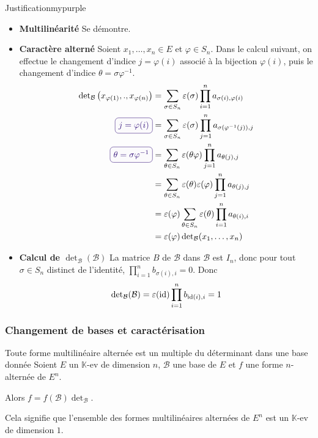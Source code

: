     \begin{demo}{Justification}{mypurple}
        \begin{itemize}
            \item \textbf{Multilinéarité} \quad Se démontre.
            \item \textbf{Caractère alterné} \quad Soient $x_1,\ldots,x_n \in E$ et $\varphi \in S_n$. Dans le calcul suivant, on effectue le changement d’indice $j = \varphi(i)$ associé à la bijection $\varphi(i)$, puis le changement d’indice $\theta = \sigma \varphi^{-1}$.
            \begin{align*}
                \det_{\mathcal{B}}\left(x_{\varphi(1)},.,x_{\varphi(n)}\right) 
                &= \sum_{\sigma \in S_n} \varepsilon(\sigma) \prod_{i = 1}^n a_{\sigma(i), \varphi(i)} \\
                \lilbox{mypurple}{$j = \varphi(i)$} 
                &= \sum_{\sigma \in S_n} \varepsilon(\sigma) \prod_{j = 1}^n a_{\sigma(\varphi^{-1}(j)), j} \\
                \lilbox{mypurple}{$\theta = \sigma \varphi^{-1}$} 
                &= \sum_{\theta \in S_n} \varepsilon(\theta \varphi) \prod_{j = 1}^n a_{\theta(j), j} \\
                &= \sum_{\theta \in S_n} \varepsilon(\theta)\varepsilon(\varphi) \prod_{j = 1}^n a_{\theta(j), j} \\
                &= \varepsilon(\varphi) \sum_{\theta \in S_n} \varepsilon(\theta) \prod_{i = 1}^n a_{\theta(i), i} \\
                &= \varepsilon(\varphi) \det_{\mathcal{B}}(x_1,\ldots,x_n)
            \end{align*}
            \item \textbf{Calcul de $\det_{\mathcal{B}}(\mathcal{B})$} \quad La matrice $B$ de $\mathcal{B}$ dans $\mathcal{B}$ est $I_n$, donc pour tout $\sigma \in S_n$ distinct de l’identité, $\prod_{i=1}^n b_{\sigma(i),i} = 0$. Donc 
            \[ \operatorname{det}_{\mathcal{B}}(\mathcal{B}) = \varepsilon(\operatorname{id}) \prod_{i=1}^n b_{\operatorname{id}(i), i} = 1 \]
        \end{itemize}
    \end{demo}

    \subsubsection{Changement de bases et caractérisation}

    \begin{theo}{Toute forme multilinéaire alternée est un multiple du déterminant dans une base donnée}{}
        Soient $E$ un $\mathbb{K}$-ev de dimension $n$, $\mathcal{B}$ une base de $E$ et $f$ une forme $n$-alternée de $E^n$.

        Alors $f = f(\mathcal{B}) \det_{\mathcal{B}}$.

        Cela signifie que l’ensemble des formes multilinéaires alternées de $E^n$ est un $\mathbb{K}$-ev de dimension $1$.
    \end{theo}

